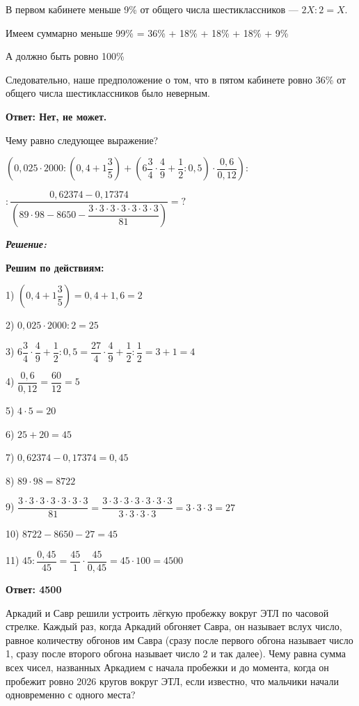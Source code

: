 В первом кабинете меньше 9\% от общего числа шестиклассников — $2X:2=X$.

Имеем суммарно меньше 99\% = 36\% + 18\% + 18\% + 18\% + 9\% 

А должно быть ровно 100\%

Следовательно, наше предположение о том, что в пятом кабинете ровно 36\% от общего числа шестиклассников было неверным.

\textbf{Ответ: Нет, не может.}


\hspace{3mm}

 Чему равно следующее выражение?

$\left(0,025\cdot2000 : \left(0,4 + 1\dfrac{3}{5}\right) + \left(6\dfrac{3}{4}\cdot\dfrac{4}{9} + \dfrac{1}{2} : 0,5\right)\cdot\dfrac{0,6}{0,12}\right):$

$:\dfrac{0,62374-0,17374}{\left(89\cdot98-8650-\dfrac{3\cdot3\cdot3\cdot3\cdot3\cdot3\cdot3}{81}\right)}=?$

\newpage
\hspace{3mm}


\centerline{\textbf{\textit{Решение:}}}



\textbf{Решим по действиям:}

1) $\left(0,4 + 1\dfrac{3}{5}\right)=0,4+1,6=2$

2) $0,025\cdot2000 :2=25$

3) $6\dfrac{3}{4}\cdot\dfrac{4}{9} + \dfrac{1}{2} : 0,5=\dfrac{27}{4}\cdot\dfrac{4}{9} + \dfrac{1}{2}:\dfrac{1}{2}=3+1=4$

4) $\dfrac{0,6}{0,12}=\dfrac{60}{12}=5$

5) $4\cdot5=20$

6) $25+20=45$

7) $0,62374-0,17374=0,45$

8) $89\cdot98=8722$

9) $\dfrac{3\cdot3\cdot3\cdot3\cdot3\cdot3\cdot3}{81}=\dfrac{3\cdot3\cdot3\cdot3\cdot3\cdot3\cdot3}{3\cdot3\cdot3\cdot3}=3\cdot3\cdot3=27$

10) $8722-8650-27=45$

11) $45:\dfrac{0,45}{45}=\dfrac{45}{1}\cdot \dfrac{45}{0,45}=45\cdot100=4500$

\textbf{Ответ: 4500}

\hspace{3mm}
\hspace{3mm}

 Аркадий и Савр решили устроить лёгкую пробежку вокруг ЭТЛ по часовой стрелке. Каждый раз, когда Аркадий обгоняет Савра, он называет вслух число, равное количеству обгонов им Савра (сразу после первого обгона называет число 1, сразу после второго обгона называет число 2 и так далее). Чему равна сумма всех чисел, названных Аркадием с начала пробежки и до момента, когда он пробежит ровно 2026 кругов вокруг ЭТЛ, если известно, что мальчики начали одновременно с одного места?

